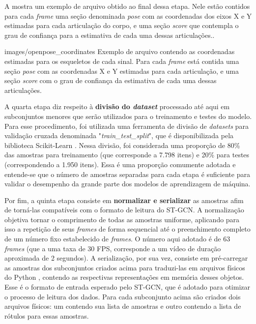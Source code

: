 A  mostra um exemplo de arquivo obtido ao final dessa etapa. Nele estão contidos para cada \textit{frame} uma seção denominada \textit{pose} com as coordenadas dos eixos X e Y estimadas para cada articulação do corpo, e uma seção \textit{score} que contempla o grau de confiança para a estimativa de cada uma dessas articulações..

    {images/openpose_coordinates}
    {Exemplo de arquivo contendo as coordenadas estimadas para os esqueletos de cada sinal. Para cada \textit{frame} está contida uma seção \textit{pose} com as coordenadas X e Y estimadas para cada articulação, e uma seção \textit{score} com o grau de confiança da estimativa de cada uma dessas articulações.}

A quarta etapa diz respeito à \textbf{divisão do \textit{dataset}} processado até aqui em subconjuntos menores que serão utilizados para o treinamento e testes do modelo. Para esse procedimento, foi utilizada uma ferramenta de divisão de \textit{datasets} para validação cruzada denominada "\textit{train\_test\_split}", que é disponibilizada pela biblioteca Scikit-Learn \cite{scikit-learn}. Nessa divisão, foi considerada uma proporção de 80\% das amostras para treinamento (que corresponde a 7.798 itens) e 20\% para testes (correspondendo a 1.950 itens). Essa é uma proporção comumente adotada e entende-se que o número de amostras separadas para cada etapa é suficiente para validar o desempenho da grande parte dos modelos de aprendizagem de máquina.

Por fim, a quinta etapa consiste em \textbf{normalizar e serializar} as amostras afim de torná-las compatíveis com o formato de leitura do ST-GCN. A normalização objetiva tornar o comprimento de todas as amostras uniforme, aplicando para isso a repetição de seus \textit{frames} de forma sequencial até o preenchimento completo de um número fixo estabelecido de \textit{frames}. O número aqui adotado é de 63 \textit{frames} (que a uma taxa de 30 FPS, corresponde a um vídeo de duração aproximada de 2 segundos). A serialização, por sua vez, consiste em pré-carregar as amostras dos subconjuntos criados acima para traduzi-las em arquivos físicos do Python \cite{python}, contendo as respectivas representações em memória desses objetos. Esse é o formato de entrada esperado pelo ST-GCN, que é adotado para otimizar o processo de leitura dos dados. Para cada subconjunto acima são criados dois arquivos físicos: um contendo sua lista de amostras e outro contendo a lista de rótulos para essas amostras. 

